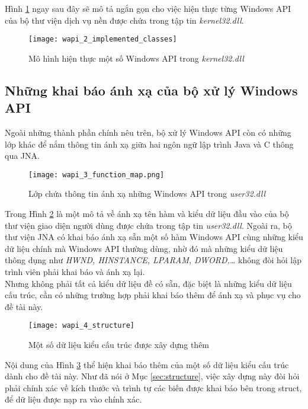 Hình \ref{fig:wapi_2_implemented_classes} ngay sau đây sẽ mô tả ngắn gọn cho việc hiện thực từng Windows API của bộ thư viện dịch vụ nền được chứa trong tập tin \textit{kernel32.dll}.

	\begin{figure}[htp]
	\centering
		\texttt{[image: wapi\_2\_implemented\_classes]}
		\caption{Mô hình hiện thực một số Windows API trong \textit{kernel32.dll}}	
		\label{fig:wapi_2_implemented_classes}		
	\end{figure}

	\newpage
	\subsection{Những khai báo ánh xạ của bộ xử lý Windows API} \label{sec:mapping}

Ngoài những thành phần chính nêu trên, bộ xử lý Windows API còn có những lớp khác để nắm thông tin ánh xạ giữa hai ngôn ngữ lập trình Java và C thông qua JNA.

	\begin{figure}[H]
	\centering
		\texttt{[image: wapi\_3\_function\_map.png]}
		\caption{Lớp chứa thông tin ánh xạ những Windows API trong \textit{user32.dll}}	
		\label{fig:wapi_3_function_map}		
	\end{figure}

Trong Hình \ref{fig:wapi_3_function_map} là một mô tả về ánh xạ tên hàm và kiểu dữ liệu đầu vào của bộ thư viện giao diện người dùng được chứa trong tập tin \textit{user32.dll}. Ngoài ra, bộ thư viện JNA có khai báo ánh xạ sẵn một số hàm Windows API cùng những kiểu dữ liệu chính mà Windows API thường dùng, nhờ đó mà những kiểu dữ liệu thông dụng như \textit{HWND, HINSTANCE, LPARAM, DWORD,…} không đòi hỏi lập trình viên phải khai báo và ánh xạ lại.\\

Nhưng không phải tất cả kiểu dữ liệu đề có sẵn, đặc biệt là những kiểu dữ liệu cấu trúc, cần có những trường hợp phải khai báo thêm để ánh xạ và phục vụ cho đề tài này.

	\begin{figure}[H]
	\centering
		\texttt{[image: wapi\_4\_structure]}
		\caption{Một số dữ liệu kiểu cấu trúc được xây dựng thêm}	
		\label{fig:wapi_4_structure}		
	\end{figure}

Nội dung của Hình \ref{fig:wapi_4_structure} thể hiện khai báo thêm của một số dữ liệu kiểu cấu trúc dành cho đề tài này. Như đã nói ở Mục \ref{sec:structure}, việc xây dựng này đòi hỏi phải chính xác về kích thước và trình tự các biến được khai báo bên trong struct, để dữ liệu được nạp ra vào chính xác.

